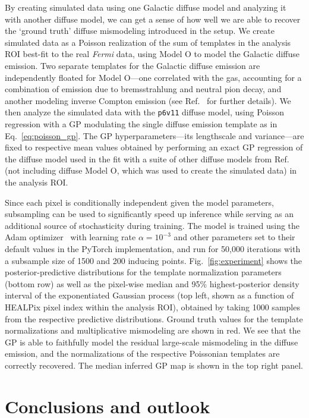 \documentclass[]{article}
\begin{document}
By creating simulated data using one Galactic diffuse model and analyzing it with another diffuse model, we can get a sense of how well we are able to recover the `ground truth' diffuse mismodeling introduced in the setup. We create simulated data as a Poisson realization of the sum of templates in the analysis ROI best-fit to the real \emph{Fermi} data, using Model O to model the Galactic diffuse emission. Two separate templates for the Galactic diffuse emission are independently floated for Model O---one correlated with the gas, accounting for a combination of emission due to bremsstrahlung and neutral pion decay, and another modeling inverse Compton emission (see Ref.~\cite{Buschmann:2020adf} for further details).  We then analyze the simulated data with the \texttt{p6v11} diffuse model, using Poisson regression with a GP modulating the single diffuse emission template as in Eq.~\eqref{eq:poisson_gp}. The GP hyperparameters---its lengthscale and variance---are fixed to respective mean values obtained by performing an exact GP regression of the diffuse model used in the fit with a suite of other diffuse models from Ref.~\cite{Ackermann:2014usa} (not including diffuse Model O, which was used to create the simulated data) in the analysis ROI.

Since each pixel is conditionally independent given the model parameters, subsampling can be used to significantly speed up inference while serving as an additional source of stochasticity during training. The model is trained using the Adam optimizer~\cite{DBLP:journals/corr/KingmaB14} with learning rate $\alpha=10^{-3}$ and other parameters set to their default values in the PyTorch implementation, and run for 50,000 iterations with a subsample size of 1500 and 200 inducing points.
Fig.~\ref{fig:experiment} shows the posterior-predictive distributions for the template normalization parameters (bottom row) as well as the pixel-wise median and 95\% highest-posterior density interval of the exponentiated Gaussian process (top left, shown as a function of HEALPix pixel index within the analysis ROI), obtained by taking 1000 samples from the respective predictive distributions. Ground truth values for the template normalizations and multiplicative mismodeling are shown in red. We see that the GP is able to faithfully model the residual large-scale mismodeling in the diffuse emission, and the normalizations of the respective Poissonian templates are correctly recovered. The median inferred GP map is shown in the top right panel.

\section{Conclusions and outlook}
\label{sec:conclusions}
\end{document}
